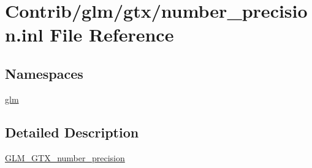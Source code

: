 \hypertarget{number__precision_8inl}{}\section{Contrib/glm/gtx/number\+\_\+precision.inl File Reference}
\label{number__precision_8inl}
\subsection*{Namespaces}
\begin{DoxyCompactItemize}
\item 
 \mbox{\hyperlink{namespaceglm}{glm}}
\end{DoxyCompactItemize}


\subsection{Detailed Description}
\mbox{\hyperlink{group__gtx__number__precision}{G\+L\+M\+\_\+\+G\+T\+X\+\_\+number\+\_\+precision}} 